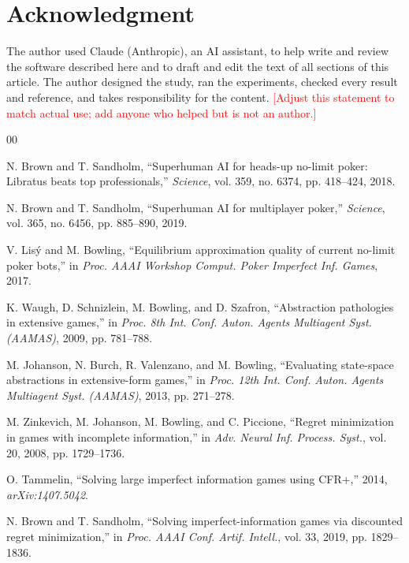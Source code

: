 \documentclass{ieeeaccess}
\newcommand{\pending}[1]{\textcolor{red}{[#1]}}
\begin{document}
\section*{Acknowledgment}
The author used Claude (Anthropic), an AI assistant, to help write and review the software
described here and to draft and edit the text of all sections of this article. The author
designed the study, ran the experiments, checked every result and reference, and takes
responsibility for the content. \pending{Adjust this statement to match actual use; add anyone
who helped but is not an author.}

\begin{thebibliography}{00}

 N. Brown and T. Sandholm, ``Superhuman AI for heads-up no-limit poker:
Libratus beats top professionals,'' \emph{Science}, vol. 359, no. 6374, pp. 418--424, 2018.

 N. Brown and T. Sandholm, ``Superhuman AI for multiplayer poker,''
\emph{Science}, vol. 365, no. 6456, pp. 885--890, 2019.

 V. Lis\'{y} and M. Bowling, ``Equilibrium approximation quality of current
no-limit poker bots,'' in \emph{Proc. AAAI Workshop Comput. Poker Imperfect Inf. Games}, 2017.

 K. Waugh, D. Schnizlein, M. Bowling, and D. Szafron, ``Abstraction
pathologies in extensive games,'' in \emph{Proc. 8th Int. Conf. Auton. Agents Multiagent Syst.
(AAMAS)}, 2009, pp. 781--788.

 M. Johanson, N. Burch, R. Valenzano, and M. Bowling, ``Evaluating
state-space abstractions in extensive-form games,'' in \emph{Proc. 12th Int. Conf. Auton. Agents
Multiagent Syst. (AAMAS)}, 2013, pp. 271--278.

 M. Zinkevich, M. Johanson, M. Bowling, and C. Piccione, ``Regret
minimization in games with incomplete information,'' in \emph{Adv. Neural Inf. Process. Syst.},
vol. 20, 2008, pp. 1729--1736.

 O. Tammelin, ``Solving large imperfect information games using CFR+,''
2014, \emph{arXiv:1407.5042}.

 N. Brown and T. Sandholm, ``Solving imperfect-information games via
discounted regret minimization,'' in \emph{Proc. AAAI Conf. Artif. Intell.}, vol. 33, 2019,
pp. 1829--1836.


\end{thebibliography}
\end{document}
